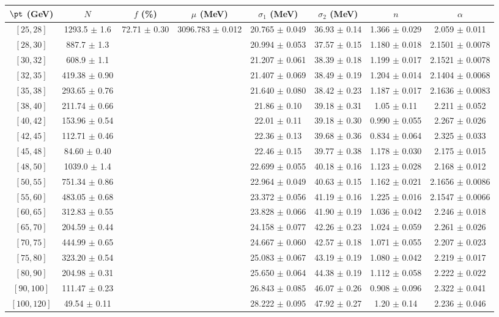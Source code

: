 \begin{tabular}{c||c|c|c|c|c|c|c}
$\pt$ (GeV) & $N$ & $f$ (\%) & $\mu$ (MeV) & $\sigma_1$ (MeV) & $\sigma_2$ (MeV) & $n$ & $\alpha$ \\
\hline
$[25, 28]$ & 1293.5 $\pm$ 1.6 & \multirow{19}{*}{72.71 $\pm$ 0.30} & \multirow{19}{*}{3096.783 $\pm$ 0.012} & 20.765 $\pm$ 0.049 & 36.93 $\pm$ 0.14 & 1.366 $\pm$ 0.029 & 2.059 $\pm$ 0.011\\
$[28, 30]$ & 887.7 $\pm$ 1.3 &  &  & 20.994 $\pm$ 0.053 & 37.57 $\pm$ 0.15 & 1.180 $\pm$ 0.018 & 2.1501 $\pm$ 0.0078\\
$[30, 32]$ & 608.9 $\pm$ 1.1 &  &  & 21.207 $\pm$ 0.061 & 38.39 $\pm$ 0.18 & 1.199 $\pm$ 0.017 & 2.1521 $\pm$ 0.0078\\
$[32, 35]$ & 419.38 $\pm$ 0.90 &  &  & 21.407 $\pm$ 0.069 & 38.49 $\pm$ 0.19 & 1.204 $\pm$ 0.014 & 2.1404 $\pm$ 0.0068\\
$[35, 38]$ & 293.65 $\pm$ 0.76 &  &  & 21.640 $\pm$ 0.080 & 38.42 $\pm$ 0.23 & 1.187 $\pm$ 0.017 & 2.1636 $\pm$ 0.0083\\
$[38, 40]$ & 211.74 $\pm$ 0.66 &  &  & 21.86 $\pm$ 0.10 & 39.18 $\pm$ 0.31 & 1.05 $\pm$ 0.11 & 2.211 $\pm$ 0.052\\
$[40, 42]$ & 153.96 $\pm$ 0.54 &  &  & 22.01 $\pm$ 0.11 & 39.18 $\pm$ 0.30 & 0.990 $\pm$ 0.055 & 2.267 $\pm$ 0.026\\
$[42, 45]$ & 112.71 $\pm$ 0.46 &  &  & 22.36 $\pm$ 0.13 & 39.68 $\pm$ 0.36 & 0.834 $\pm$ 0.064 & 2.325 $\pm$ 0.033\\
$[45, 48]$ & 84.60 $\pm$ 0.40 &  &  & 22.46 $\pm$ 0.15 & 39.77 $\pm$ 0.38 & 1.178 $\pm$ 0.030 & 2.175 $\pm$ 0.015\\
$[48, 50]$ & 1039.0 $\pm$ 1.4 &  &  & 22.699 $\pm$ 0.055 & 40.18 $\pm$ 0.16 & 1.123 $\pm$ 0.028 & 2.168 $\pm$ 0.012\\
$[50, 55]$ & 751.34 $\pm$ 0.86 &  &  & 22.964 $\pm$ 0.049 & 40.63 $\pm$ 0.15 & 1.162 $\pm$ 0.021 & 2.1656 $\pm$ 0.0086\\
$[55, 60]$ & 483.05 $\pm$ 0.68 &  &  & 23.372 $\pm$ 0.056 & 41.19 $\pm$ 0.16 & 1.225 $\pm$ 0.016 & 2.1547 $\pm$ 0.0066\\
$[60, 65]$ & 312.83 $\pm$ 0.55 &  &  & 23.828 $\pm$ 0.066 & 41.90 $\pm$ 0.19 & 1.036 $\pm$ 0.042 & 2.246 $\pm$ 0.018\\
$[65, 70]$ & 204.59 $\pm$ 0.44 &  &  & 24.158 $\pm$ 0.077 & 42.26 $\pm$ 0.23 & 1.024 $\pm$ 0.059 & 2.261 $\pm$ 0.026\\
$[70, 75]$ & 444.99 $\pm$ 0.65 &  &  & 24.667 $\pm$ 0.060 & 42.57 $\pm$ 0.18 & 1.071 $\pm$ 0.055 & 2.207 $\pm$ 0.023\\
$[75, 80]$ & 323.20 $\pm$ 0.54 &  &  & 25.083 $\pm$ 0.067 & 43.19 $\pm$ 0.19 & 1.080 $\pm$ 0.042 & 2.219 $\pm$ 0.017\\
$[80, 90]$ & 204.98 $\pm$ 0.31 &  &  & 25.650 $\pm$ 0.064 & 44.38 $\pm$ 0.19 & 1.112 $\pm$ 0.058 & 2.222 $\pm$ 0.022\\
$[90, 100]$ & 111.47 $\pm$ 0.23 &  &  & 26.843 $\pm$ 0.085 & 46.07 $\pm$ 0.26 & 0.908 $\pm$ 0.096 & 2.322 $\pm$ 0.041\\
$[100, 120]$ & 49.54 $\pm$ 0.11 &  &  & 28.222 $\pm$ 0.095 & 47.92 $\pm$ 0.27 & 1.20 $\pm$ 0.14 & 2.236 $\pm$ 0.046\\
\end{tabular}
